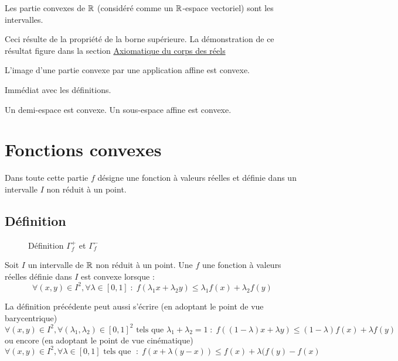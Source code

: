 \begin{prop}
 Les partie convexes de $\mathbb{R}$ (considéré comme un $\mathbb{R}$-espace vectoriel) sont les intervalles.
\end{prop}
\begin{demo}
 Ceci résulte de la propriété de la borne supérieure. La démonstration de ce résultat figure dans la section \href{\baseurl C2192.pdf}{Axiomatique du corps des réels}  
\end{demo}

\begin{prop}
 L'image d'une partie convexe par une application affine est convexe.
\end{prop}
\begin{demo}
 Immédiat avec les définitions.
\end{demo}
\begin{exples}
 Un demi-espace est convexe. Un sous-espace affine est convexe.
\end{exples}

\section{Fonctions convexes}
Dans toute cette partie $f$ désigne une fonction à valeurs réelles et définie dans un intervalle $I$ non réduit à un point.
\subsection{Définition}
\begin{figure}[ht]
 \centering
 
\caption{Définition $\Gamma_f^+$ et $\Gamma_f^-$}
\end{figure}
\begin{defi}
 Soit $I$ un intervalle de $\mathbb{R}$ non réduit à un point. Une $f$ une fonction à valeurs réelles définie dans $I$ est convexe lorsque :
\begin{displaymath}
 \forall (x,y)\in I^2 , \forall \lambda \in [0,1]\; :\; f(\lambda_1 x+\lambda_2 y)\leq \lambda_1 f(x)+\lambda_2 f(y)
\end{displaymath}
\end{defi}
\begin{rem}
 La définition précédente peut aussi s'écrire (en adoptant le point de vue barycentrique)
\begin{displaymath}
 \forall (x,y)\in I^2 , \forall (\lambda_1,\lambda_2) \in [0,1]^2 \text{ tels que } \lambda_1+\lambda_2=1\; :\; f((1-\lambda)x+\lambda y)\leq (1-\lambda)f(x)+\lambda f(y)
\end{displaymath}
ou encore (en adoptant le point de vue cinématique)
\begin{displaymath}
 \forall (x,y)\in I^2 , \forall \lambda \in [0,1] \text{ tels que } \; :\; f(x+\lambda (y-x))\leq f(x)+\lambda (f(y)-f(x)
\end{displaymath}
\end{rem}

